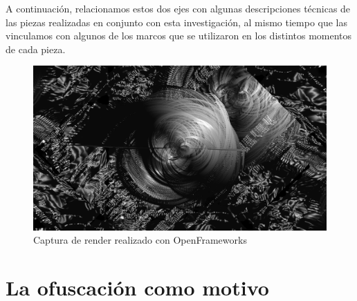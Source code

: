 
A continuación, relacionamos estos dos ejes con algunas descripciones técnicas de las piezas realizadas en conjunto con esta investigación, al mismo tiempo que las vinculamos con algunos de los marcos que se utilizaron en los distintos momentos de cada pieza.


\begin{figure} 
\includegraphics[width=\columnwidth]{../img/of13.png} 
\caption[Openframeworks 1]{Captura de render realizado con OpenFrameworks} %
\label{fig:gallery} 
\end{figure}

\clearpage




\section{La ofuscación como motivo}

